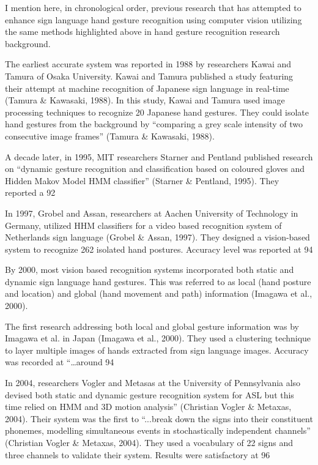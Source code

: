 I mention here, in chronological order, previous research that has attempted to enhance sign language hand gesture recognition using computer vision utilizing the same methods highlighted above in hand gesture recognition research background.

The earliest accurate system was reported in 1988 by researchers Kawai and Tamura of Osaka University. Kawai and Tamura published a study featuring their attempt at machine recognition of Japanese sign language in real-time (Tamura \& Kawasaki, 1988). In this study, Kawai and Tamura used image processing techniques to recognize 20 Japanese hand gestures. They could isolate hand gestures from the background by ``comparing a grey scale intensity of two consecutive image frames'' (Tamura \& Kawasaki, 1988).

A decade later, in 1995, MIT researchers Starner and Pentland published research on ``dynamic gesture recognition and classification based on coloured gloves and Hidden Makov Model HMM classifier'' (Starner \& Pentland, 1995). They reported a 92%

In 1997, Grobel and Assan, researchers at Aachen University of Technology in Germany, utilized HHM classifiers for a video based recognition system of Netherlands sign language (Grobel \& Assan, 1997). They designed a vision-based system to recognize 262 isolated hand postures. Accuracy level was reported at 94%

By 2000, most vision based recognition systems incorporated both static and dynamic sign language hand gestures. This was referred to as local (hand posture and location) and global (hand movement and path) information (Imagawa et al., 2000).

The first research addressing both local and global gesture information was by Imagawa et al. in Japan (Imagawa et al., 2000). They used a clustering technique to layer multiple images of hands extracted from sign language images. Accuracy was recorded at ``…around 94 %

In 2004, researchers Vogler and Metasas at the University of Pennsylvania also devised both static and dynamic gesture recognition system for ASL but this time relied on HMM and 3D motion analysis'' (Christian Vogler \& Metaxas, 2004). Their system was the first to ``...break down the signs into their constituent phonemes, modelling simultaneous events in stochastically independent channels'' (Christian Vogler \& Metaxas, 2004). They used a vocabulary of 22 signs and three channels to validate their system. Results were satisfactory at 96%

